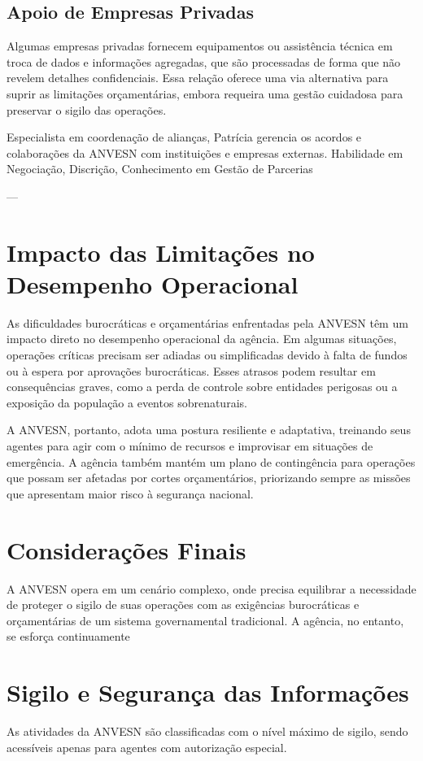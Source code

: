 \subsection{Apoio de Empresas Privadas}
Algumas empresas privadas fornecem equipamentos ou assistência técnica em troca de dados e informações agregadas, que são processadas de forma que não revelem detalhes confidenciais. Essa relação oferece uma via alternativa para suprir as limitações orçamentárias, embora requeira uma gestão cuidadosa para preservar o sigilo das operações.

{Especialista em coordenação de alianças, Patrícia gerencia os acordos e colaborações da ANVESN com instituições e empresas externas.}
{Habilidade em Negociação, Discrição, Conhecimento em Gestão de Parcerias}

---

\section{Impacto das Limitações no Desempenho Operacional}
As dificuldades burocráticas e orçamentárias enfrentadas pela ANVESN têm um impacto direto no desempenho operacional da agência. Em algumas situações, operações críticas precisam ser adiadas ou simplificadas devido à falta de fundos ou à espera por aprovações burocráticas. Esses atrasos podem resultar em consequências graves, como a perda de controle sobre entidades perigosas ou a exposição da população a eventos sobrenaturais.

A ANVESN, portanto, adota uma postura resiliente e adaptativa, treinando seus agentes para agir com o mínimo de recursos e improvisar em situações de emergência. A agência também mantém um plano de contingência para operações que possam ser afetadas por cortes orçamentários, priorizando sempre as missões que apresentam maior risco à segurança nacional.

\section{Considerações Finais}
A ANVESN opera em um cenário complexo, onde precisa equilibrar a necessidade de proteger o sigilo de suas operações com as exigências burocráticas e orçamentárias de um sistema governamental tradicional. A agência, no entanto, se esforça continuamente




\section{Sigilo e Segurança das Informações}
As atividades da ANVESN são classificadas com o nível máximo de sigilo, sendo acessíveis apenas para agentes com autorização especial.


